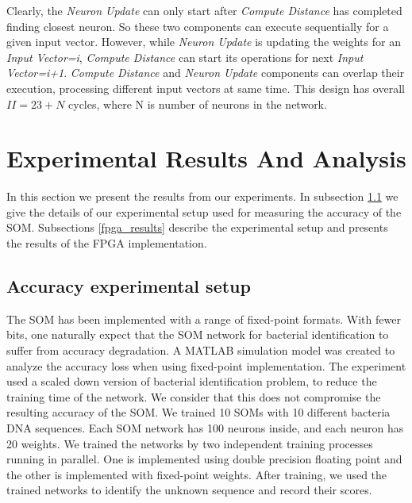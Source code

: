 Clearly, the \textit{Neuron Update} can only start after \textit{Compute Distance} has completed finding closest neuron. So these two components can execute sequentially for a given input vector. However, while \textit{Neuron Update} is updating the weights for an \textit{Input Vector=i}, \textit{Compute Distance} can start its operations for next \textit{Input Vector=i+1}.  \textit{Compute Distance} and \textit{Neuron Update} components can overlap their execution, processing different input vectors at same time. This design has overall ${II=23+N}$ cycles, where N is number of neurons in the network.

\section{Experimental Results And Analysis}\label{sec:results}
In this section we present the results from our experiments. In subsection \ref{ex_setup} we give the details of our experimental setup used for measuring the accuracy of the SOM. Subsections \ref{fpga_results} describe the experimental setup and presents the results of the FPGA implementation.
\subsection{Accuracy experimental setup}\label{ex_setup}
The SOM has been implemented with a range of fixed-point formats. With fewer bits, one naturally expect that the SOM network for bacterial identification to suffer from accuracy degradation. A MATLAB simulation model was created to analyze the accuracy loss when using fixed-point implementation. The experiment used a scaled down version of bacterial identification problem, to reduce the training time of the network. We consider that this does not compromise the resulting accuracy of the SOM. We trained 10 SOMs with 10 different bacteria DNA sequences. Each SOM network has 100 neurons inside, and each neuron has 20 weights. We trained the networks by two independent training processes running in parallel. One is implemented using double precision floating point and the other is implemented with fixed-point weights. After training, we used the trained networks to identify the unknown sequence and record their scores.

